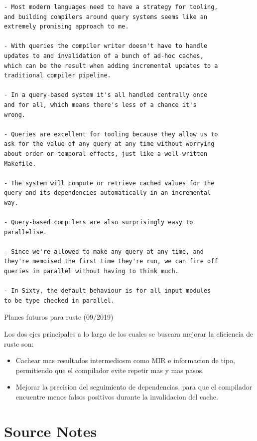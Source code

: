 \begin{verbatim}
- Most modern languages need to have a strategy for tooling,
and building compilers around query systems seems like an
extremely promising approach to me.

- With queries the compiler writer doesn't have to handle
updates to and invalidation of a bunch of ad-hoc caches,
which can be the result when adding incremental updates to a
traditional compiler pipeline.

- In a query-based system it's all handled centrally once
and for all, which means there's less of a chance it's
wrong.

- Queries are excellent for tooling because they allow us to
ask for the value of any query at any time without worrying
about order or temporal effects, just like a well-written
Makefile.

- The system will compute or retrieve cached values for the
query and its dependencies automatically in an incremental
way.

- Query-based compilers are also surprisingly easy to
parallelise.

- Since we're allowed to make any query at any time, and
they're memoised the first time they're run, we can fire off
queries in parallel without having to think much.

- In Sixty, the default behaviour is for all input modules
to be type checked in parallel.
\end{verbatim}
\cite{olle_query_based}

Planes futuros para rustc (09/2019)

Los dos ejes principales a lo largo de los cuales se buscara mejorar la eficiencia de rustc son:
\begin{itemize}[noitemsep]
\item Cachear mas resultados intermediosm como MIR e informacion de tipo, permitiendo que el compilador evite repetir mas y mas pasos.
\item Mejorar la precision del seguimiento de dependencias, para que el compilador encuentre menos falsos positivos durante la invalidacion del cache.
\end{itemize}
\cite{rust_blog_incremental_compilation}

\chapter*{Source Notes}


